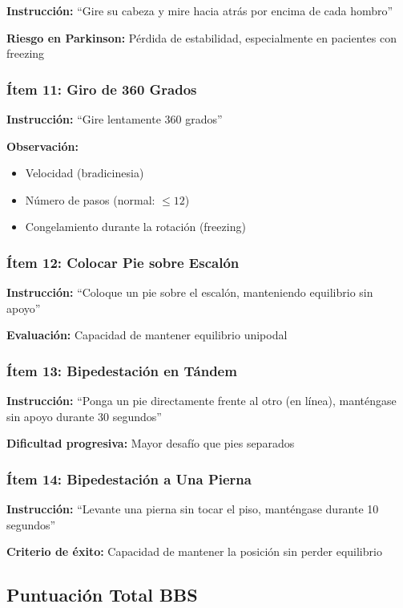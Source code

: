 \documentclass[12pt,a4paper,spanish,oneside]{book}
\begin{document}
\textbf{Instrucción:} ``Gire su cabeza y mire hacia atrás por encima de cada hombro''

\textbf{Riesgo en Parkinson:} Pérdida de estabilidad, especialmente en pacientes con freezing

\subsubsection{Ítem 11: Giro de 360 Grados}

\textbf{Instrucción:} ``Gire lentamente 360 grados''

\textbf{Observación:}
\begin{itemize}
  \item Velocidad (bradicinesia)
  \item Número de pasos (normal: $\leq 12$)
  \item Congelamiento durante la rotación (freezing)
\end{itemize}

\subsubsection{Ítem 12: Colocar Pie sobre Escalón}

\textbf{Instrucción:} ``Coloque un pie sobre el escalón, manteniendo equilibrio sin apoyo''

\textbf{Evaluación:} Capacidad de mantener equilibrio unipodal

\subsubsection{Ítem 13: Bipedestación en Tándem}

\textbf{Instrucción:} ``Ponga un pie directamente frente al otro (en línea), manténgase sin apoyo durante 30 segundos''

\textbf{Dificultad progresiva:} Mayor desafío que pies separados

\subsubsection{Ítem 14: Bipedestación a Una Pierna}

\textbf{Instrucción:} ``Levante una pierna sin tocar el piso, manténgase durante 10 segundos''

\textbf{Criterio de éxito:} Capacidad de mantener la posición sin perder equilibrio

\subsection{Puntuación Total BBS}
\end{document}
